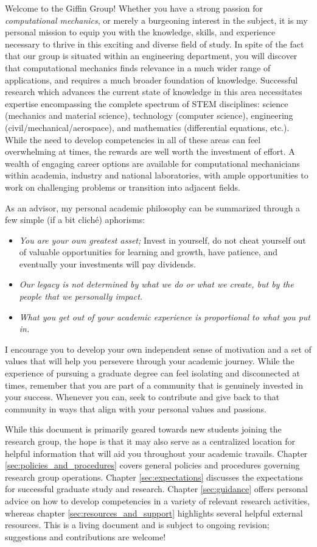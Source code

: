 \documentclass[12pt,a4paper,article,oneside]{memoir} %
\begin{document}
Welcome to the Giffin Group! Whether you have a strong passion for \textit{computational mechanics}, or merely a burgeoning interest in the subject, it is my personal mission to equip you with the knowledge, skills, and experience necessary to thrive in this exciting and diverse field of study. In spite of the fact that our group is situated within an engineering department, you will discover that computational mechanics finds relevance in a much wider range of applications, and requires a much broader foundation of knowledge. Successful research which advances the current state of knowledge in this area necessitates expertise encompassing the complete spectrum of STEM disciplines: science (mechanics and material science), technology (computer science), engineering (civil/mechanical/aerospace), and mathematics (differential equations, etc.). While the need to develop competencies in all of these areas can feel overwhelming at times, the rewards are well worth the investment of effort. A wealth of engaging career options are available for computational mechanicians within academia, industry and national laboratories, with ample opportunities to work on challenging problems or transition into adjacent fields.

As an advisor, my personal academic philosophy can be summarized through a few simple (if a bit clich\'{e}) aphorisms:
\begin{itemize}
\item \textit{You are your own greatest asset;} Invest in yourself, do not cheat yourself out of valuable opportunities for learning and growth, have patience, and eventually your investments will pay dividends.
\item \textit{Our legacy is not determined by what we do or what we create, but by the people that we personally impact.}
\item \textit{What you get out of your academic experience is proportional to what you put in.}
\end{itemize}
I encourage you to develop your own independent sense of motivation and a set of values that will help you persevere through your academic journey. While the experience of pursuing a graduate degree can feel isolating and disconnected at times, remember that you are part of a community that is genuinely invested in your success. Whenever you can, seek to contribute and give back to that community in ways that align with your personal values and passions.

While this document is primarily geared towards new students joining the research group, the hope is that it may also serve as a centralized location for helpful information that will aid you throughout your academic travails. Chapter \ref{sec:policies_and_procedures} covers general policies and procedures governing research group operations. Chapter \ref{sec:expectations} discusses the expectations for successful graduate study and research. Chapter \ref{sec:guidance} offers personal advice on how to develop competencies in a variety of relevant research activities, whereas chapter \ref{sec:resources_and_support} highlights several helpful external resources. This is a living document and is subject to ongoing revision; suggestions and contributions are welcome!
\end{document}
